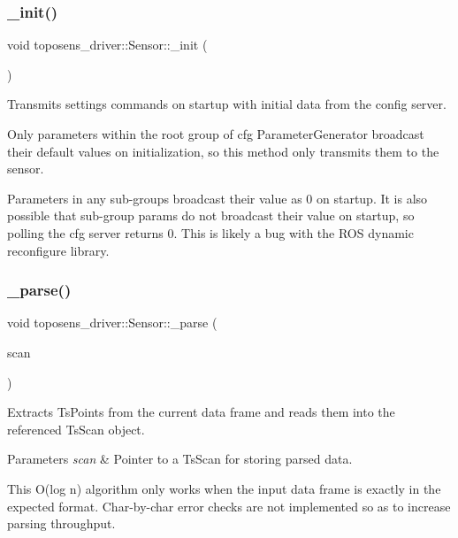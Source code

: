 \subsubsection{\texorpdfstring{\+\_\+init()}{\_init()}}
{\footnotesize\ttfamily void toposens\+\_\+driver\+::\+Sensor\+::\+\_\+init (\begin{DoxyParamCaption}\item[{void}]{ }\end{DoxyParamCaption})\hspace{0.3cm}{\ttfamily [private]}}

Transmits settings commands on startup with initial data from the config server.

Only parameters within the root group of cfg Parameter\+Generator broadcast their default values on initialization, so this method only transmits them to the sensor.

Parameters in any sub-\/groups broadcast their value as 0 on startup. It is also possible that sub-\/group params do not broadcast their value on startup, so polling the cfg server returns 0. This is likely a bug with the R\+OS dynamic reconfigure library. \mbox{\label{classtoposens__driver_1_1Sensor_a662f061f7fd3181f0ca5527d6f244b6d}} 
\subsubsection{\texorpdfstring{\+\_\+parse()}{\_parse()}}
{\footnotesize\ttfamily void toposens\+\_\+driver\+::\+Sensor\+::\+\_\+parse (\begin{DoxyParamCaption}\item[{toposens\+\_\+msgs\+::\+Ts\+Scan \&}]{scan }\end{DoxyParamCaption})\hspace{0.3cm}{\ttfamily [private]}}

Extracts Ts\+Points from the current data frame and reads them into the referenced Ts\+Scan object. 
\begin{DoxyParams}{Parameters}
{\em scan} & Pointer to a Ts\+Scan for storing parsed data.\\
\hline
\end{DoxyParams}
This O(log n) algorithm only works when the input data frame is exactly in the expected format. Char-\/by-\/char error checks are not implemented so as to increase parsing throughput.

